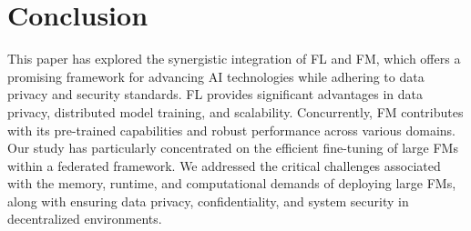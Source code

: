 \section{Conclusion}

This paper has explored the synergistic integration of FL and FM, which offers a promising framework for advancing AI technologies while adhering to data privacy and security standards. FL provides significant advantages in data privacy, distributed model training, and scalability. Concurrently, FM contributes with its pre-trained capabilities and robust performance across various domains. Our study has particularly concentrated on the efficient fine-tuning of large FMs within a federated framework. We addressed the critical challenges associated with the memory, runtime, and computational demands of deploying large FMs, along with ensuring data privacy, confidentiality, and system security in decentralized environments. 